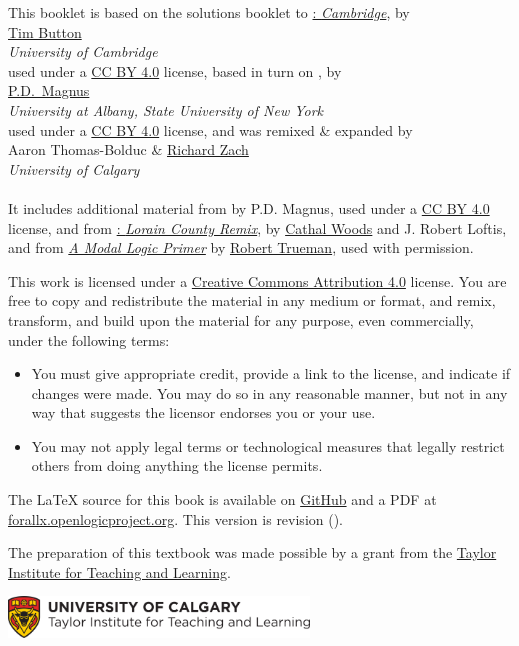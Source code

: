 \noindent This booklet is based on the solutions booklet to \href{https://www.homepages.ucl.ac.uk/~uctytbu/OERs.html}{\forallx: \emph{Cambridge}}, by\\[2ex]
\href{https://www.homepages.ucl.ac.uk/~uctytbu/}{Tim Button}\\
\emph{University of Cambridge}\\[2ex]
used under a \href{https://creativecommons.org/licenses/by/4.0/}{CC BY 4.0} license, based in turn on \href{https://www.fecundity.com/logic/}{\forallx}, by\\[2ex]
\href{https://www.fecundity.com/job/}{P.D.\ Magnus}\\
\emph{University at Albany, State University of New York}\\[2ex]
used under a \href{https://creativecommons.org/licenses/by/4.0/}{CC BY
4.0} license, and was remixed \& expanded by\\[2ex] {Aaron
Thomas-Bolduc \& \href{https://richardzach.org/}{Richard Zach}}\\
\emph{University of Calgary}
\\
\\
It includes additional material from \forallx{} by P.D. Magnus, used
under a \href{https://creativecommons.org/licenses/by/4.0/}{CC BY 4.0}
license, and
from \href{https://github.com/rob-helpy-chalk/openintroduction}{\forallx: \emph{Lorain
County Remix}},
by \href{https://sites.google.com/site/cathalwoods/}{Cathal Woods} and
J. Robert Loftis, and from
\href{http://www.rtrueman.com/uploads/7/0/3/2/70324387/modal_logic_primer.pdf}{\emph{A Modal Logic Primer}} by \href{http://www.rtrueman.com/}{Robert
Trueman}, used with permission.

\bigskip

\noindent This work is licensed under a \href{https://creativecommons.org/licenses/by/4.0/}{Creative Commons Attribution 4.0} license.
You are free to copy and redistribute the material in any medium or format, and  remix, transform, and build upon the material for any purpose, even commercially, under the following terms:
\begin{itemize}
\item You must give appropriate credit, provide a link to the license, and indicate if changes were made. You may do so in any reasonable manner, but not in any way that suggests the licensor endorses you or your use.
\item You may not apply legal terms or technological measures that legally restrict others from doing anything the license permits.
\end{itemize}
The \LaTeX{} source for this book is available on
\href{https://github.com/rzach/forallx-yyc/}{GitHub} and a PDF at
\href{https://forallx.openlogicproject.org}{forallx.openlogicproject.org}.
This version is revision \gitAbbrevHash{} (\gitCommitterDate).

\bigskip
\noindent The preparation of this textbook was made possible by a grant from the \href{https://taylorinstitute.ucalgary.ca/}{Taylor Institute for Teaching and Learning}.

\bigskip
\noindent
\href{https://taylorinstitute.ucalgary.ca/}{\includegraphics[width=8cm]{../assets/ti-color}}
